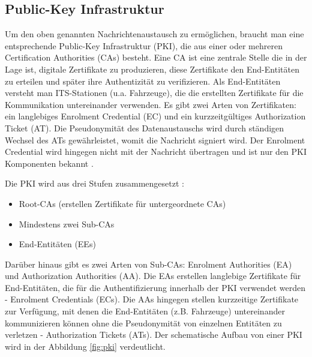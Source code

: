 \subsection{Public-Key Infrastruktur}
\label{sec:FirstContentSection:FirstSubSection}
 
Um den oben genannten Nachrichtenaustausch zu ermöglichen, braucht man eine entsprechende Public-Key Infrastruktur (PKI), die aus einer oder mehreren Certification Authorities (CAs) besteht. Eine CA ist eine zentrale Stelle die in der Lage ist, digitale Zertifikate zu produzieren, diese Zertifikate den End-Entitäten zu erteilen und später ihre Authentizität zu verifizieren. Als End-Entitäten versteht man ITS-Stationen (u.a. Fahrzeuge), die die erstellten Zertifikate für die Kommunikation untereinander verwenden. Es gibt zwei Arten von Zertifikaten: ein langlebiges Enrolment Credential (EC) und ein kurzzeitgültiges Authorization Ticket (AT). Die Pseudonymität des Datenaustauschs wird durch ständigen Wechsel des ATs gewährleistet, womit die Nachricht signiert wird. Der Enrolment Credential wird hingegen nicht mit der Nachricht übertragen und ist nur den PKI Komponenten bekannt \cite{Strubbe2017}. 

Die PKI wird aus drei Stufen zusammengesetzt \cite{SecurityCITS}: 
\begin{itemize}
	\item Root-CAs (erstellen Zertifikate für untergeordnete CAs)
	\item Mindestens zwei Sub-CAs
	\item End-Entitäten (EEs)
\end{itemize}

Darüber hinaus gibt es zwei Arten von Sub-CAs: Enrolment Authorities (EA) und Authorization Authorities (AA). Die EAs erstellen langlebige Zertifikate für End-Entitäten, die für die Authentifizierung innerhalb der PKI verwendet werden - Enrolment Credentials (ECs). Die AAs hingegen stellen kurzzeitige Zertifikate zur Verfügung, mit denen die End-Entitäten (z.B. Fahrzeuge) untereinander kommunizieren können ohne die Pseudonymität von einzelnen Entitäten zu verletzen - Authorization Tickets (ATs). Der schematische Aufbau von einer PKI wird in der Abbildung \ref{fig:pki} verdeutlicht.

